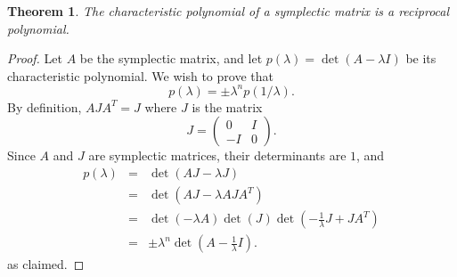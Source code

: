 \documentclass[12pt]{article}
\newtheorem{thm}{Theorem}
\begin{document}
\begin{thm}
The characteristic polynomial of a symplectic matrix is a reciprocal polynomial.
\end{thm}

\begin{proof}
Let $A$ be the symplectic matrix, and let
$p(\lambda) = \det(A-\lambda I)$ be
its characteristic polynomial. We wish to prove that
$$
p(\lambda) = \pm \lambda^n p(1/\lambda).
$$
By definition, $AJA^T=J$ where $J$ is the matrix
$$
J=\left( \begin{array}{cc}
0 & I \\
-I & 0
\end{array} \right).
$$
Since $A$ and $J$ are symplectic matrices, their determinants are $1$, and
\begin{eqnarray*}
p(\lambda) &=& \det (AJ - \lambda J) \\
           &=&\det (AJ - \lambda AJA^T) \\
           &=&\det (-\lambda A) \det (J) \det (-\frac{1}{\lambda} J + JA^T) \\
           &=&\pm \lambda^n \det (A-\frac{1}{\lambda} I ).
\end{eqnarray*}
as claimed.
\end{proof}
\end{document}
